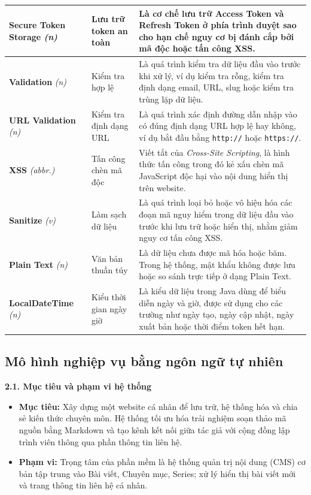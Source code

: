 \documentclass[a4paper,12pt]{article}
\begin{document}
\begin{longtable}{|p{3.5cm}|p{3.5cm}|p{8cm}|}
\textbf{Secure Token Storage} \textit{(n)} & Lưu trữ token an toàn & Là cơ chế lưu trữ Access Token và Refresh Token ở phía trình duyệt sao cho hạn chế nguy cơ bị đánh cắp bởi mã độc hoặc tấn công XSS. \\
\hline

\textbf{Validation} \textit{(n)} & Kiểm tra hợp lệ & Là quá trình kiểm tra dữ liệu đầu vào trước khi xử lý, ví dụ kiểm tra rỗng, kiểm tra định dạng email, URL, slug hoặc kiểm tra trùng lặp dữ liệu. \\
\hline

\textbf{URL Validation} \textit{(n)} & Kiểm tra định dạng URL & Là quá trình xác định đường dẫn nhập vào có đúng định dạng URL hợp lệ hay không, ví dụ bắt đầu bằng \texttt{http://} hoặc \texttt{https://}. \\
\hline

\textbf{XSS} \textit{(abbr.)} & Tấn công chèn mã độc & Viết tắt của \textit{Cross-Site Scripting}, là hình thức tấn công trong đó kẻ xấu chèn mã JavaScript độc hại vào nội dung hiển thị trên website. \\
\hline

\textbf{Sanitize} \textit{(v)} & Làm sạch dữ liệu & Là quá trình loại bỏ hoặc vô hiệu hóa các đoạn mã nguy hiểm trong dữ liệu đầu vào trước khi lưu trữ hoặc hiển thị, nhằm giảm nguy cơ tấn công XSS. \\
\hline

\textbf{Plain Text} \textit{(n)} & Văn bản thuần túy & Là dữ liệu chưa được mã hóa hoặc băm. Trong hệ thống, mật khẩu không được lưu hoặc so sánh trực tiếp ở dạng Plain Text. \\
\hline

\textbf{LocalDateTime} \textit{(n)} & Kiểu thời gian ngày giờ & Là kiểu dữ liệu trong Java dùng để biểu diễn ngày và giờ, được sử dụng cho các trường như ngày tạo, ngày cập nhật, ngày xuất bản hoặc thời điểm token hết hạn. \\
\hline

\end{longtable}

\subsection{Mô hình nghiệp vụ bằng ngôn ngữ tự nhiên}

\textbf{2.1. Mục tiêu và phạm vi hệ thống}
\begin{itemize}
    \item \textbf{Mục tiêu:} Xây dựng một website cá nhân để lưu trữ, hệ thống hóa và chia sẻ kiến thức chuyên môn. Hệ thống tối ưu hóa trải nghiệm soạn thảo mã nguồn bằng Markdown và tạo kênh kết nối giữa tác giả với cộng đồng lập trình viên thông qua phần thông tin liên hệ.
    \item \textbf{Phạm vi:} Trọng tâm của phần mềm là hệ thống quản trị nội dung (CMS) cơ bản tập trung vào Bài viết, Chuyên mục, Series; xử lý hiển thị bài viết mới và trang thông tin liên hệ cá nhân.
\end{itemize}
\end{document}
